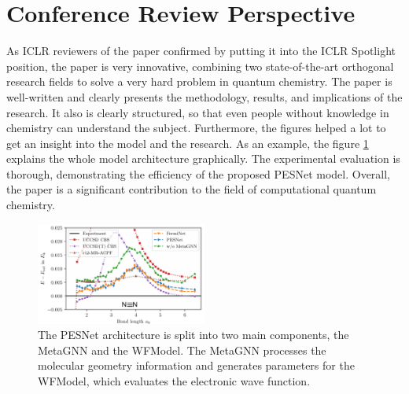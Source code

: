 \documentclass{article}
\begin{document}
\section{Conference Review Perspective}
As ICLR reviewers of the paper confirmed by putting it into the ICLR Spotlight position, the paper is very innovative, combining two state-of-the-art orthogonal research fields to solve a very hard problem in quantum chemistry. The paper is well-written and clearly presents the methodology, results, and implications of the research. It also is clearly structured, so that even people without knowledge in chemistry can understand the subject. Furthermore, the figures helped a lot to get an insight into the model and the research. As an example, the figure \ref{fig:architecture} explains the whole model architecture graphically. The experimental evaluation is thorough, demonstrating the efficiency of the proposed PESNet model. Overall, the paper is a significant contribution to the field of computational quantum chemistry.

\begin{figure}[h]
    \centering
    \includegraphics[width=0.5\textwidth]{FermiNet_PesNet_comparison}
    \caption{The PESNet architecture is split into two main components, the MetaGNN and the WFModel. The MetaGNN processes the molecular geometry information and generates parameters for the WFModel, which evaluates the electronic wave function.}
    \label{fig:architecture}
\end{figure}
\end{document}
